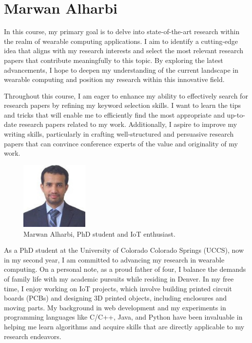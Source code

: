 \section{Marwan Alharbi}

In this course, my primary goal is to delve into state-of-the-art research within the realm of wearable computing applications. I aim to identify a cutting-edge idea that aligns with my research interests and select the most relevant research papers that contribute meaningfully to this topic. By exploring the latest advancements, I hope to deepen my understanding of the current landscape in wearable computing and position my research within this innovative field.

Throughout this course, I am eager to enhance my ability to effectively search for research papers by refining my keyword selection skills. I want to learn the tips and tricks that will enable me to efficiently find the most appropriate and up-to-date research papers related to my work. Additionally, I aspire to improve my writing skills, particularly in crafting well-structured and persuasive research papers that can convince conference experts of the value and originality of my work.

\begin{figure}[h]
  \centering
  \includegraphics[width=0.30\textwidth]{images/marwan-profile.jpg}
  \caption{Marwan Alharbi, PhD student and IoT enthusiast.}
  \label{fig:marwan:profile}
\end{figure}

As a PhD student at the University of Colorado Colorado Springs (UCCS), now 
in my second year, I am committed to advancing my research in wearable 
computing. On a personal note, as a proud father of four, I balance the 
demands of family life with my academic pursuits while residing in Denver. 
In my free time, I enjoy working on IoT projects, which involve building 
printed circuit boards (PCBs) and designing 3D printed objects, including 
enclosures and moving parts. My background in web development and my 
experiments in programming languages like C/C++, Java, and Python have been 
invaluable in helping me learn algorithms and acquire skills that are 
directly applicable to my research endeavors.



